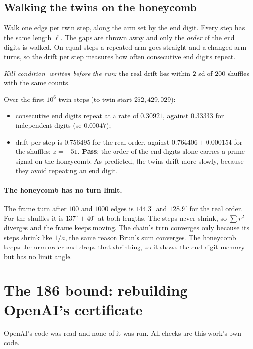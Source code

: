 \subsection{Walking the twins on the honeycomb} 
Walk one edge per twin step, along the arm set by the end digit. Every step has the same length $\ell$. The gaps are thrown away and only the \emph{order} of the end digits is walked. On equal steps a repeated arm goes straight and a changed arm turns, so the drift per step measures how often consecutive end digits repeat.

\emph{Kill condition, written before the run:} the real drift lies within $2$ sd of $200$ shuffles with the same counts.

\noindent Over the first $10^6$ twin steps (to twin start $252{,}429{,}029$):
\begin{itemize}
\item consecutive end digits repeat at a rate of $0.30921$, against $0.33333$ for independent digits (se $0.00047$);
\item drift per step is $0.756495$ for the real order, against $0.764406\pm0.000154$ for the shuffles: $z=-51$. \textbf{Pass}: the order of the end digits alone carries a prime signal on the honeycomb. As predicted, the twins drift more slowly, because they avoid repeating an end digit.
\end{itemize}

\paragraph{The honeycomb has no turn limit.} The frame turn after $100$ and $1000$ edges is $144.3^\circ$ and $128.9^\circ$ for the real order. For the shuffles it is $137^\circ\pm40^\circ$ at both lengths. The steps never shrink, so $\sum r^2$ diverges and the frame keeps moving. The chain's turn converges only because its steps shrink like $1/a$, the same reason Brun's sum converges. The honeycomb keeps the arm order and drops that shrinking, so it shows the end-digit memory but has no limit angle.

\section{The 186 bound: rebuilding OpenAI's certificate}\label{sec:186}

\noindent OpenAI's code was read and none of it was run. All checks are this work's own code.

